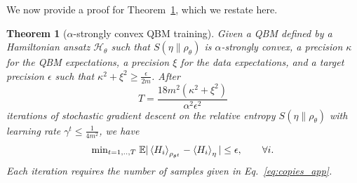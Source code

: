 \documentclass[
    reprint,
    aps,
    prx,
    longbibliography
]{revtex4-2}
\newtheorem{theorem}{Theorem}
\begin{document}
We now provide a proof for Theorem~\ref{appthm:training_alpha}, which we restate here. 

\begingroup
\def\thetheorem{2}
\begin{theorem}[$\alpha$-strongly convex QBM training]\label{appthm:training_alpha}
Given a QBM defined by a Hamiltonian ansatz $\mathcal{H}_\theta$ such that $S(\eta\|\rho_\theta)$ is $\alpha$-strongly convex, a precision $\kappa$ for the QBM expectations, a precision $\xi$ for the data expectations, and a target precision $\epsilon$ such that $\kappa^2 + \xi^2 \geq \frac{\epsilon}{2m}$. After
\begin{equation}
    T =\frac{18 m^2 (\kappa^2 + \xi^2)}{\alpha^2\epsilon^2}
\end{equation} 
iterations of stochastic gradient descent on the relative entropy $S(\eta \|\rho_\theta)$ with learning rate $\gamma^t \leq \frac{1}{4m^2}$, we have
\begin{equation}
    \mathrm{min}_{t=1,..,T} \; \mathbb{E}| \expval{H_i}_{\rho_{\theta^t}}  - \expval{H_i}_\eta | \leq \epsilon, \qquad \forall i.
\end{equation} 
Each iteration requires the number of samples given in Eq.~\eqref{eq:copies_app}. 
\end{theorem} 
\endgroup
\end{document}
